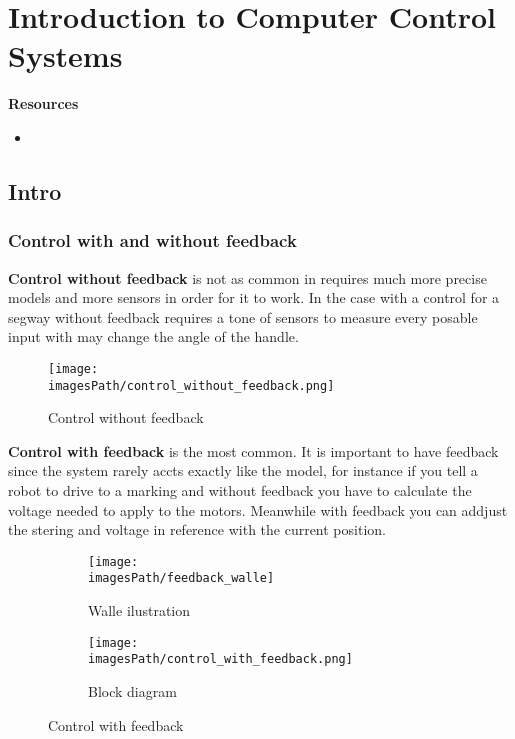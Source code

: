 \chapter{Introduction to Computer Control Systems}

\textbf{Resources}
\begin{itemize}
    \item \url{}
\end{itemize}

\newpage

\section{Intro}
\subsection{Control with and without feedback}
\textbf{Control without feedback} is not as common in requires much more
precise models and more sensors in order for it to work. In the case with 
a control for a segway without feedback requires a tone of sensors to measure
every posable input with may change the angle of the handle.

\begin{figure}[!h]
    \centering
    \texttt{[image: \\imagesPath/control\_without\_feedback.png]}
    \caption{Control without feedback}
\end{figure}

\textbf{Control with feedback} is the most common. It is important to have feedback 
since the system rarely accts exactly like the model, for instance if you tell a robot
to drive to a marking and without feedback you have to calculate the voltage needed to
apply to the motors. Meanwhile with feedback you can addjust the stering and voltage 
in reference with the current position.
\begin{figure}[!h]
     \centering
     \begin{subfigure}[b]{0.3\textwidth}
         \centering
         \texttt{[image: \\imagesPath/feedback\_walle]}
         \caption{Walle ilustration}
         \label{fig:y equals x}
     \end{subfigure}
     \hfill
     \begin{subfigure}[b]{0.6\textwidth}
         \centering
         \texttt{[image: \\imagesPath/control\_with\_feedback.png]}
         \caption{Block diagram}
         \label{fig:three sin x}
     \end{subfigure}
        \caption{Control with feedback}
        \label{fig:control_with_feedback}
\end{figure}

